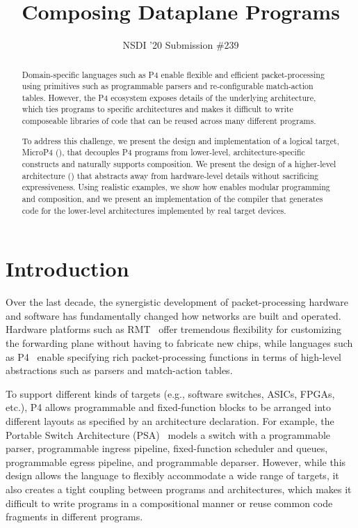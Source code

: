 \documentclass[letterpaper,twocolumn,10pt]{article}
\begin{document}
\date{}
\title{\Large \bf Composing Dataplane Programs}
\author{{\rm NSDI '20 Submission \#239}}
\maketitle

\vspace*{-3em}

\begin{abstract}
Domain-specific languages such as P4 enable flexible and efficient
packet-processing using primitives such as programmable parsers and
re-configurable match-action tables. However, the P4 ecosystem exposes
details of the underlying architecture, which ties programs to
specific architectures and makes it difficult to write composeable
libraries of code that can be reused across many different programs.

To address this challenge, we present the design and implementation of
a logical target, MicroP4 (\uswitch), that decouples P4 programs from
lower-level, architecture-specific constructs and naturally supports
composition. We present the design of a higher-level architecture
(\uarch) that abstracts away from hardware-level details without
sacrificing expressiveness. Using realistic examples, we show how
\uswitch enables modular programming and composition, and we present
an implementation of the \ucomp compiler that generates code for the
lower-level architectures implemented by real target devices.
\end{abstract}

\section{Introduction}
\label{sec:intro}
Over the last decade, the synergistic development of packet-processing
hardware and software has fundamentally changed how networks are built
and operated. Hardware platforms such as
RMT~\cite{bosshart2013forwarding} offer tremendous flexibility for
customizing the forwarding plane without having to fabricate new
chips, while languages such as P4~\cite{bosshart2014p4, p4lang} enable
specifying rich packet-processing functions in terms of high-level
abstractions such as parsers and match-action tables.

To support different kinds of targets (e.g., software switches, ASICs,
FPGAs, etc.), P4 allows programmable and fixed-function blocks to be
arranged into different layouts as specified by an architecture
declaration. For example, the Portable Switch Architecture
(PSA)~\cite{psa} models a switch with a programmable parser,
programmable ingress pipeline, fixed-function scheduler and queues,
programmable egress pipeline, and programmable deparser. However,
while this design allows the language to flexibly accommodate a wide
range of targets, it also creates a tight coupling between programs
and architectures, which makes it difficult to write programs in a
compositional manner or reuse common code fragments in different
programs.
\end{document}
